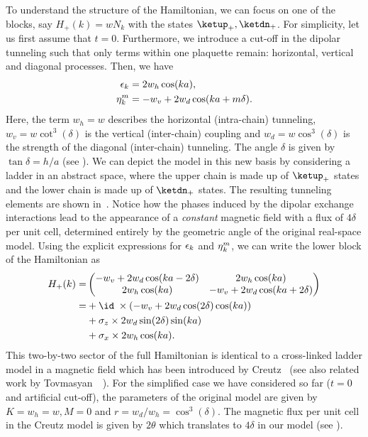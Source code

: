 
To understand the structure of the Hamiltonian, we can focus on one of the blocks, say $H_+(k) = w N_k$ with the states $\ketup_+, \ketdn_+$.
For simplicity, let us first assume that $t=0$.
Furthermore, we introduce a cut-off in the dipolar tunneling such that only terms within one plaquette remain: horizontal, vertical and diagonal processes.
Then, we have
\begin{align}
    \operatorname{\epsilon}_k &= 2 w_h \cos(ka), \\
    \eta_k^m &= -w_v + 2 w_d \cos(ka + m\delta).
\end{align}
Here, the term $w_h = w$ describes the horizontal (intra-chain) tunneling, $w_v = w \cot^3(\delta)$ is the vertical (inter-chain) coupling and $w_d = w \cos^3(\delta)$ is the strength of the diagonal (inter-chain) tunneling.
The angle $\delta$ is given by $\tan \delta = h/a$ (see ).
We can depict the model in this new basis by considering a ladder in an abstract space, where the upper chain is made up of $\ketup_+$ states and the lower chain is made up of $\ketdn_+$ states.
The resulting tunneling elements are shown in~.
Notice how the phases induced by the dipolar exchange interactions lead to the appearance of a \emph{constant} magnetic field with a flux of $4\delta$ per unit cell, determined entirely by the geometric angle of the original real-space model.
Using the explicit expressions for $\operatorname{\epsilon}_k$ and $\operatorname{\eta}^m_k$, we can write the lower block of the Hamiltonian as
\begin{align}
    H_+(k) = &\begin{pmatrix}
        -w_v + 2w_d \cos(ka-2\delta) & 2w_h \cos(ka) \\
        2w_h\cos(ka) & -w_v + 2w_d \cos(ka+2\delta)
    \end{pmatrix} \\
    = &+\id \; \times (-w_v + 2w_d \cos(2\delta) \cos(ka)) \\
    &+\sigma_z \times 2w_d \sin(2\delta) \sin(ka) \\
    &+\sigma_x \times 2w_h \cos(ka).
\end{align}
This two-by-two sector of the full Hamiltonian is identical to a cross-linked ladder model in a magnetic field which has been introduced by Creutz~\cite{Creutz1999} (see also related work by Tovmasyan~\etal~\cite{Tovmasyan2013a}).
For the simplified case we have considered so far ($t=0$ and artificial cut-off), the parameters of the original model are given by $K=w_h=w, M=0$ and $r=w_d/w_h=\cos^3(\delta)$.
The magnetic flux per unit cell in the Creutz model is given by $2\theta$ which translates to $4\delta$ in our model (see ).


